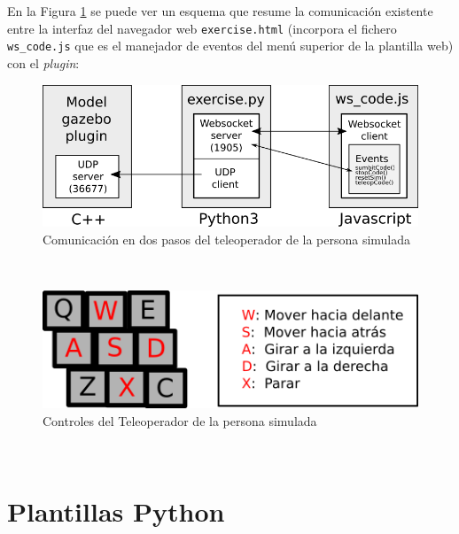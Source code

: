 En la Figura \ref{fig:comunicacion_teleoperador} se puede ver un esquema que resume la comunicación existente entre la interfaz del navegador web \texttt{exercise.html} (incorpora el fichero \texttt{ws\_code.js} que es el manejador de eventos del menú superior de la plantilla web) con el \textit{plugin}:\\

\begin{figure} [H]
  \begin{center}
    \includegraphics[width=15cm]{imagenes/cap5/comunicacion-teleoperador.png}
  \end{center}
  \caption[Comunicación en dos pasos del teleoperador de la persona simulada]{Comunicación en dos pasos del teleoperador de la persona simulada}
  \label{fig:comunicacion_teleoperador}
\end{figure}\

\begin{figure} [H]
  \begin{center}
    \includegraphics{imagenes/cap5/controles-teleoperador.png}
  \end{center}
  \caption[Controles del teleoperador de la persona simulada]{Controles del Teleoperador de la persona simulada}
  \label{fig:controles_teleoperador}
\end{figure}\



\section{Plantillas Python}
\label{sec:plantilla_python}

